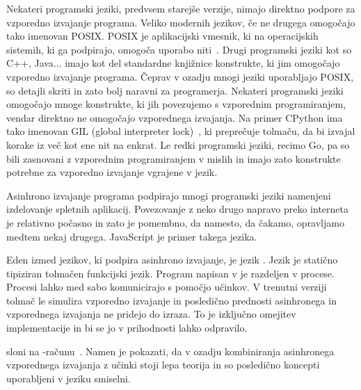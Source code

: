 



Nekateri programski jeziki, predvsem starejše verzije, nimajo direktno podpore za vzporedno izvajanje programa. 
Veliko modernih jezikov, če ne drugega omogočajo tako imenovan POSIX. POSIX je aplikacijski vmesnik, ki na operacijskih sistemih, ki ga podpirajo, omogoča uporabo niti~\cite{posix}.
Drugi programski jeziki kot so C++, Java... imajo kot del standardne knjižnice konstrukte, ki jim omogočajo vzporedno izvajanje programa. Čeprav v ozadju mnogi jeziki uporabljajo POSIX, so detajli skriti in zato bolj naravni za programerja. 
Nekateri programski jeziki omogočajo mnoge konstrukte, ki jih povezujemo s vzporednim programiranjem, vendar direktno ne omogočajo vzporednega izvajanja. Na primer CPython ima tako imenovan GIL (global  interpreter lock)~\cite{gil}, ki preprečuje tolmaču, da bi izvajal korake iz več kot ene nit na enkrat.
Le redki programski jeziki, recimo Go, pa so bili zasnovani z vzporednim programiranjem v mislih in imajo zato konstrukte potrebne za vzporedno izvajanje vgrajene v jezik.

Asinhrono izvajanje programa podpirajo mnogi programski jeziki namenjeni izdelovanje spletnih aplikacij. Povezovanje z neko drugo napravo preko interneta je relativno počasno in zato je pomembno, da namesto, da čakamo, opravljamo medtem nekaj drugega. JavaScript je primer takega jezika. 



Eden izmed jezikov, ki podpira asinhrono izvajanje, je jezik \aeff{}. Jezik \aeff{} je statično tipiziran tolmačen funkcijski jezik. Program napisan v \aeff{} je razdeljen v procese. Procesi lahko med sabo komunicirajo s pomočjo učinkov. V trenutni verziji tolmač le simulira vzporedno izvajanje in posledično prednosti asinhronega in vzporednega izvajanja ne pridejo do izraza. To je izključno omejitev implementacije in bi se jo v prihodnosti lahko odpravilo.

\aeff{} sloni na \lae{}-računu~\cite{aeff}. Namen \lae{} je pokazati, da v ozadju kombiniranja asinhronega vzporednega izvajanja z učinki stoji lepa teorija in so posledično koncepti uporabljeni v jeziku \aeff{} smiselni.  
 



